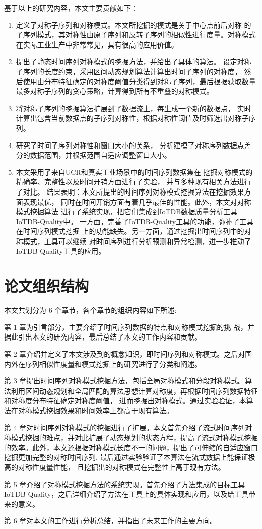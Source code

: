 基于以上的研究内容，本文主要贡献如下：
\begin{enumerate}
\item 定义了对称子序列和对称模式。本文所挖掘的模式是关于中心点前后对称
的子序列模式，其对称性由原子序列和反转子序列的相似性进行度量。对称模式
在实际工业生产中非常常见，具有很高的应用价值。
\item 提出了静态时间序列对称模式的挖掘方法，并给出了具体的算法。
设定对称子序列的长度约束，采用区间动态规划算法计算出时间子序列的对称度，
然后使用由分布特征确定的对称度阈值分类得到对称子序列，最后根据获取数量
最多对称子序列的贪心策略，计算得到所有不重叠的对称模式。
\item 将对称子序列的挖掘算法扩展到了数据流上，每生成一个新的数据点，
实时计算出包含当前数据点的子序列对称性，根据对称性阈值及时筛选出对称子序列。
\item 研究了时间子序列对称性和窗口大小的关系，
分析建模了对称序列数据点差分的数据范围，并根据范围自适应调整窗口大小。
\item 本文采用了来自UCR和真实工业场景中的时间序列数据集在
挖掘对称模式的精确率、完整性以及时间开销方面进行了实验，
并与多种现有相关方法进行了对比。
结果表明：本文所提出的时间序列对称模式挖掘算法在挖掘效果方面表现最优，
同时在时间开销方面有着几乎最佳的性能。此外，本文对对称模式挖掘算法
进行了系统实现，把它们集成到IoTDB数据质量分析工具IoTDB-Quality中。
一方面，完善了IoTDB-Quality工具的功能，弥补了工具在时间序列模式挖掘
上的功能缺失。另一方面，通过挖掘出时间序列中的对称模式，工具可以继续
对时间序列进行分析预测和异常检测，进一步推动了IoTDB-Quality工具的应用。
\end{enumerate}

\section{论文组织结构}

本文共划分为 6 个章节，各个章节的组织内容如下所述:

第 1 章为引言部分，主要介绍了时间序列数据的特点和对称模式挖掘的挑 战，并据此引出本文的研究内容，最后总结了本文的工作内容和贡献。

第 2 章介绍并定义了本文涉及到的概念知识，即时间序列和对称模式。之后对国内外在序列相似性度量和模式挖掘上的研究进行了分类和阐述。

第 3 章提出时间序列对称模式挖掘方法，包括全局对称模式和分段对称模式。算法利用区间动态规划和全局匹配的算法思想计算对称度，再根据时间序列数据特征和对称度分布特征确定对称度阈值，
进而挖掘出对称模式。通过实验验证，本算法在对称模式挖掘效果和时间效率上都高于现有算法。

第 4 章对时间序列对称模式的挖掘进行了扩展。本文首先介绍了流式时间序列对称模式挖掘的难点，并对此扩展了动态规划的状态方程，提高了流式对称模式挖掘的效率。此外，本文还根据对称模式长度不一的问题，提出了可伸缩的自适应窗口挖掘更加完整的对称时间序列.
最后通过实验验证了本算法在流式数据上能保证极高的对称性度量性能，
且挖掘出的对称模式在完整性上高于现有方法。

第 5 章介绍了对称模式挖掘方法的系统实现。首先介绍了方法集成的目标工具 IoTDB-Quality，之后详细介绍了方法在工具上的具体实现和应用，以及给工具带来的意义。

第 6 章对本文的工作进行分析总结，并指出了未来工作的主要方向。 
